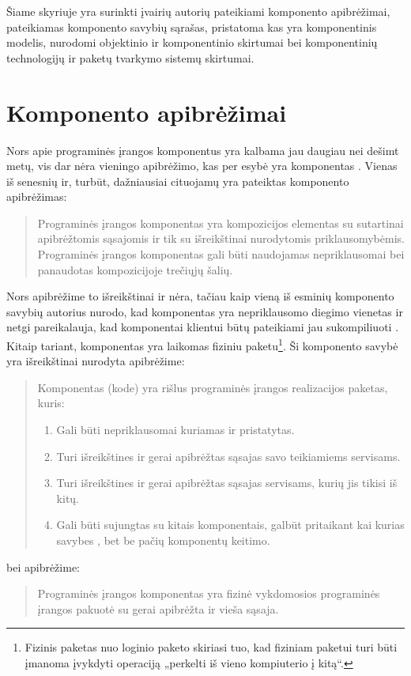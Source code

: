 
\label{chapter:component}

Šiame skyriuje yra surinkti įvairių autorių pateikiami komponento
apibrėžimai, pateikiamas komponento savybių sąrašas, pristatoma kas
yra komponentinis modelis, nurodomi objektinio ir komponentinio
skirtumai bei komponentinių technologijų ir paketų tvarkymo sistemų
skirtumai.

\section{Komponento apibrėžimai}

\label{section:component:descriptions}

Nors apie programinės įrangos komponentus yra kalbama jau daugiau
nei dešimt metų, vis dar nėra vieningo apibrėžimo, kas per esybė
yra komponentas \cite{classification-framework-for-scm}. Vienas
iš senesnių ir, turbūt, dažniausiai cituojamų yra 
\cite[41]{cs-beyond-object-oriented-programming}
pateiktas komponento apibrėžimas:
\begin{quote}
  Programinės įrangos komponentas yra kompozicijos elementas su
  sutartinai apibrėžtomis sąsajomis ir tik su išreikštinai
  nurodytomis priklausomybėmis. Programinės įrangos komponentas
  gali būti naudojamas nepriklausomai bei panaudotas
  kompozicijoje trečiųjų šalių.
\end{quote}
Nors apibrėžime to išreikštinai ir nėra, tačiau kaip vieną iš
esminių komponento savybių autorius nurodo, kad komponentas yra
nepriklausomo diegimo vienetas 
\cite[36]{cs-beyond-object-oriented-programming} ir netgi
pareikalauja, kad komponentai klientui būtų pateikiami jau
sukompiliuoti \cite{point-counterpoint}. Kitaip tariant, komponentas
yra laikomas fiziniu paketu\footnote{Fizinis paketas nuo loginio paketo
skiriasi tuo, kad fiziniam paketui turi būti įmanoma įvykdyti
operaciją „perkelti iš vieno kompiuterio į kitą“.}. Ši
komponento savybė yra išreikštinai
nurodyta \cite[385]{objects-components-and-frameworks-with-uml}
apibrėžime:
\begin{quote}
  Komponentas (kode) yra rišlus programinės įrangos realizacijos
  paketas, kuris:
  \begin{enumerate}
    \item Gali būti nepriklausomai kuriamas ir pristatytas.
    \item Turi išreikštines ir gerai apibrėžtas sąsajas savo teikiamiems
      servisams.
    \item Turi išreikštines ir gerai apibrėžtas sąsajas servisams,
      kurių jis tikisi iš kitų.
    \item Gali būti sujungtas su kitais komponentais, galbūt pritaikant
      kai kurias savybes , bet be pačių komponentų
      keitimo.
  \end{enumerate}
\end{quote}
bei \cite[1]{Hopkins:2000:CP:352183.352198} apibrėžime:
\begin{quote}
  Programinės įrangos komponentas yra fizinė vykdomosios programinės
  įrangos pakuotė su gerai apibrėžta ir vieša sąsaja.
\end{quote}

